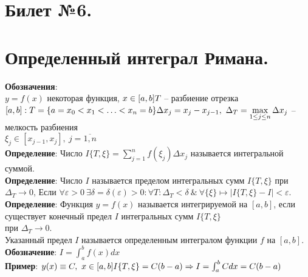 \documentclass[a4paper,12pt]{article} %
\begin{document}
\section*{Билет №6.}
\section*{Определенный интеграл Римана.}
\noindent \textbf{Обозначения}:\\
\noindent$y = f(x)$ некоторая функция, $x \in [a,b]\\T$ -- разбиение отрезка $[a,b]: T = \{a = x_0 < x_1 < {\dots} < x_n = b \}\\\Delta x_j = x_j - x_{j-1},~\Delta_T = \max\limits_{1\leq j\leq n}\Delta x_j$ -- мелкость разбиения\\ $\xi_j \in [x_{j-1},x_j],~j = \overline{1,n}$\\

\noindent \textbf{Определение}: Число $I\{T,\xi\} =  \sum_{j = 1}^{n} {f(\xi_j)\Delta x_j}$ называется интегральной суммой.\\

\noindent \textbf{Определение}: Число $I$ называется пределом интегральных сумм $I\{T,\xi\}$ при $\Delta_T \longrightarrow 0$, Если $\forall\varepsilon>0~\exists\delta = \delta(\varepsilon)>0: \forall T:\Delta_{T}<\delta~\&~ \forall\{\xi\} \longmapsto|I\{T, \xi\}-I|<\varepsilon$.\\

\noindent \textbf{Определение}: Функция $y = f(x)$ называется интегрируемой на $[a,b]$, если существует конечный предел $I$ интегральных сумм $I\{T,\xi\}$\\ при $\Delta_T \longrightarrow 0$.\\
Указанный предел $I$ называется определенным интегралом функции $f$ на $[a,b]$.\\
\noindent \textbf{Обозначение}: $I = \int_{a}^{b} {f(x)dx}$\\

\noindent \textbf{Пример}: $y(x)\equiv C,~x\in[a,b]\\
I\{T,\xi\} = C(b-a) \Rightarrow I = \int_{a}^{b} {Cdx} = C(b-a)$\\
\end{document}
